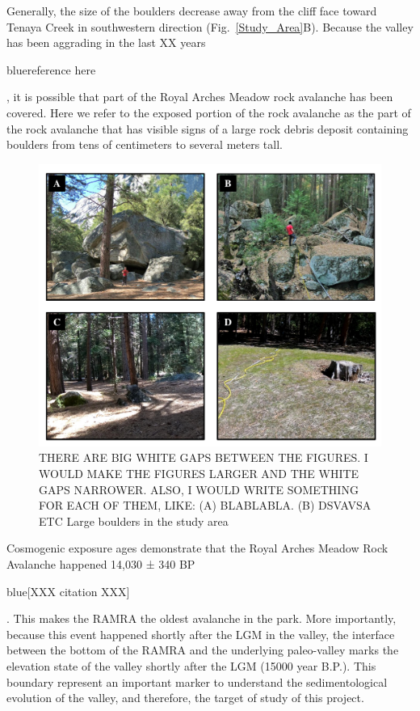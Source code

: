 \documentclass[5p]{elsarticle}
\newcommand{\COMON}{\begin{color}{blue}}
\newcommand{\COMOFF}{\end{color}}
\begin{document}
Generally, the size of the boulders decrease away from the cliff face toward Tenaya Creek in southwestern direction (Fig.~\ref{Study_Area}B). Because the valley has been aggrading in the last XX years \COMON reference here \COMOFF, it is possible that part of the Royal Arches Meadow rock avalanche has been covered. Here we refer to the exposed portion of the rock avalanche as the part of the rock avalanche that has visible signs of a large rock debris deposit containing boulders from tens of centimeters to several meters tall.   


\begin{figure}[h]

  \includegraphics[width=\textwidth]{Study_Area2.pdf}
  \caption{ THERE ARE BIG WHITE GAPS BETWEEN THE FIGURES. I WOULD MAKE
    THE FIGURES LARGER AND THE WHITE GAPS NARROWER. ALSO, I WOULD
    WRITE SOMETHING FOR EACH OF THEM, LIKE: (A) BLABLABLA. (B) DSVAVSA
    ETC Large boulders in the study area  \label{Study_Area2}}
  
\end{figure}



Cosmogenic  exposure ages demonstrate that the Royal Arches Meadow Rock Avalanche happened 14,030 ± 340 BP \COMON[XXX citation XXX]\COMOFF. This makes the RAMRA the oldest avalanche in the park. More importantly, because this event happened shortly after the LGM in the valley, the interface between the bottom of the RAMRA and the underlying paleo-valley marks the elevation state of the valley shortly after the LGM (15000 year B.P.). This boundary represent an important marker to understand the sedimentological evolution of the valley, and therefore, the target of study of this project.  
\end{document}

